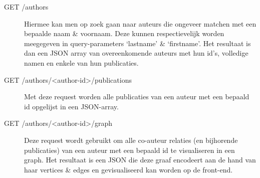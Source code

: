 \documentclass{article}
\begin{document}
\begin{description}

\item[GET /authors] Hiermee kan men op zoek gaan naar auteurs die ongeveer matchen met een bepaalde naam \& voornaam. Deze kunnen respectievelijk worden meegegeven in query-parameters `lastname' \& `firstname'. Het resultaat is dan een JSON array van overeenkomende auteurs met hun id's, volledige namen en enkele van hun publicaties.

\item[GET /authors/<author-id>/publications] Met deze request worden alle publicaties van een auteur met een bepaald id opgelijst in een JSON-array.

\item[GET /authors/<author-id>/graph] Deze request wordt gebruikt om alle co-auteur relaties (en bijhorende publicaties) van een auteur met een bepaald id te visualiseren in een graph. Het resultaat is een JSON die deze graaf encodeert aan de hand van haar vertices \& edges en gevisualiseerd kan worden op de front-end.

\end{description}

\clearpage




\end{document}
